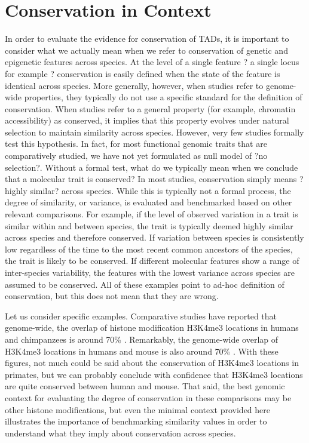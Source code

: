 \section{Conservation in Context}
In order to evaluate the evidence for conservation of TADs, it is important to consider what we actually mean when we refer to conservation of genetic and epigenetic features across species. At the level of a single feature ? a single locus for example ? conservation is easily defined when the state of the feature is identical across species. More generally, however, when studies refer to genome-wide properties, they typically do not use a specific standard for the definition of conservation. When studies refer to a general property (for example, chromatin accessibility) as conserved, it implies that this property evolves under natural selection to maintain similarity across species. However, very few studies formally test this hypothesis. In fact, for most functional genomic traits that are comparatively studied, we have not yet formulated as null model of ?no selection?. 
Without a formal test, what do we typically mean when we conclude that a molecular trait is conserved? In most studies, conservation simply means ?highly similar? across species. While this is typically not a formal process, the degree of similarity, or variance, is evaluated and benchmarked based on other relevant comparisons. For example, if the level of observed variation in a trait is similar within and between species, the trait is typically deemed highly similar across species and therefore conserved. If variation between species is consistently low regardless of the time to the most recent common ancestors of the species, the trait is likely to be conserved. If different molecular features show a range of inter-species variability, the features with the lowest variance across species are assumed to be conserved. All of these examples point to ad-hoc definition of conservation, but this does not mean that they are wrong.

Let us consider specific examples. Comparative studies have reported that genome-wide, the overlap of histone modification H3K4me3 locations in humans and chimpanzees is around 70\% \cite{Cain.2011}. Remarkably, the genome-wide overlap of H3K4me3 locations in humans and mouse is also around 70\% \cite{Woo.2012}. With these figures, not much could be said about the conservation of H3K4me3 locations in primates, but we can probably conclude with confidence that H3K4me3 locations are quite conserved between human and mouse. That said, the best genomic context for evaluating the degree of conservation in these comparisons may be other histone modifications, but even the minimal context provided here illustrates the importance of benchmarking similarity values in order to understand what they imply about conservation across species. 

